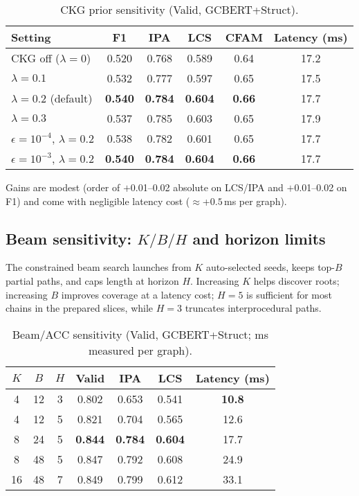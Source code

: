 \documentclass{buthesis}
\begin{document}
\begin{table}[H]
\centering
\small
\setlength{\tabcolsep}{6pt}
\renewcommand{\arraystretch}{1.10}
\caption{CKG prior sensitivity (Valid, GCBERT{+}Struct).}
\label{tab:ablate-ckg}
\begin{tabular}{l c c c c c}
\toprule
\textbf{Setting} & F1 & IPA & LCS & CFAM & Latency (ms) \\
\midrule
CKG off ($\lambda{=}0$)            & 0.520 & 0.768 & 0.589 & 0.64 & 17.2 \\
$\lambda{=}0.1$                    & 0.532 & 0.777 & 0.597 & 0.65 & 17.5 \\
$\lambda{=}0.2$ (default)          & \textbf{0.540} & \textbf{0.784} & \textbf{0.604} & \textbf{0.66} & 17.7 \\
$\lambda{=}0.3$                    & 0.537 & 0.785 & 0.603 & 0.65 & 17.9 \\
\midrule
$\epsilon{=}10^{-4}$, $\lambda{=}0.2$ & 0.538 & 0.782 & 0.601 & 0.65 & 17.7 \\
$\epsilon{=}10^{-3}$, $\lambda{=}0.2$ & \textbf{0.540} & \textbf{0.784} & \textbf{0.604} & \textbf{0.66} & 17.7 \\
\bottomrule
\end{tabular}
\end{table}

\noindent Gains are modest (order of $+$0.01--0.02 absolute on LCS/IPA and $+$0.01--0.02 on F1) and come with negligible latency cost ($\approx$+$0.5$\,ms per graph).

\subsection{Beam sensitivity: $K/B/H$ and horizon limits}
\label{subsec:ablate-beam}

The constrained beam search launches from $K$ auto-selected seeds, keeps top-$B$ partial paths, and caps length at horizon $H$. Increasing $K$ helps discover roots; increasing $B$ improves coverage at a latency cost; $H{=}5$ is sufficient for most chains in the prepared slices, while $H{=}3$ truncates interprocedural paths.

\begin{table}[H]
\centering
\small
\setlength{\tabcolsep}{5pt}
\renewcommand{\arraystretch}{1.10}
\caption{Beam/ACC sensitivity (Valid, GCBERT{+}Struct; ms measured per graph).}
\label{tab:ablate-beam}
\begin{tabular}{c c c c c c c}
\toprule
$K$ & $B$ & $H$ & Valid & IPA & LCS & Latency (ms) \\
\midrule
4  & 12 & 3 & 0.802 & 0.653 & 0.541 & \textbf{10.8} \\
4  & 12 & 5 & 0.821 & 0.704 & 0.565 & 12.6 \\
8  & 24 & 5 & \textbf{0.844} & \textbf{0.784} & \textbf{0.604} & 17.7 \\
8  & 48 & 5 & 0.847 & 0.792 & 0.608 & 24.9 \\
16 & 48 & 7 & 0.849 & 0.799 & 0.612 & 33.1 \\
\bottomrule
\end{tabular}
\end{table}
\end{document}
